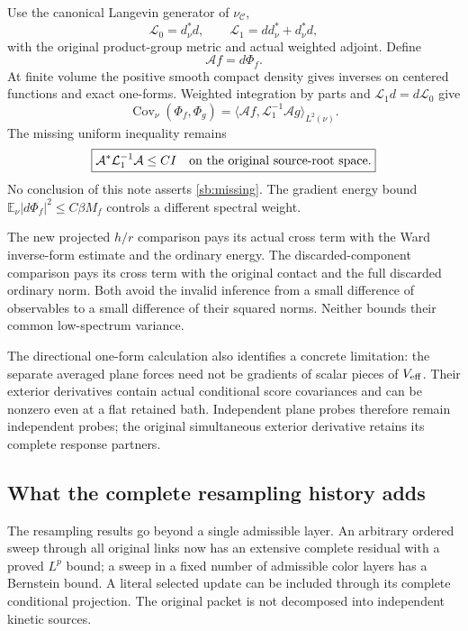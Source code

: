 \documentclass[11pt]{article}
\theoremstyle{definition}\newtheorem{definition}[theorem]{Definition}
\theoremstyle{remark}\newtheorem{remark}[theorem]{Remark}
\newcommand{\E}{\mathbb E}\newcommand{\Var}{\operatorname{Var}}
\newcommand{\Cov}{\operatorname{Cov}}\newcommand{\Tr}{\operatorname{Tr}}
\newcommand{\inner}[2]{\langle #1,#2\rangle}
\begin{document}
Use the canonical Langevin generator of \(\nu_{\mathcal C}\),
\[
 \mathcal L_0=d_\nu^*d,\qquad
 \mathcal L_1=dd_\nu^*+d_\nu^*d,
\]
with the original product-group metric and actual weighted adjoint. Define
\[
 \mathcal A f=d\Phi_f.
\]
At finite volume the positive smooth compact density gives inverses on centered functions and exact one-forms. Weighted integration by parts and
\(\mathcal L_1d=d\mathcal L_0\) give
\begin{equation}
 \Cov_\nu(\Phi_f,\Phi_g)
 =
 \inner{\mathcal Af}{\mathcal L_1^{-1}\mathcal Ag}_{L^2(\nu)}.
 \label{sb:actualresolvent}
\end{equation}
The missing uniform inequality remains
\begin{equation}
 \boxed{\mathcal A^*\mathcal L_1^{-1}\mathcal A\le CI
        \quad\hbox{on the original source-root space}.}
 \label{sb:missing}
\end{equation}
No conclusion of this note asserts \eqref{sb:missing}. The gradient energy bound
\(\E_\nu|d\Phi_f|^2\le C\beta M_f\) controls a different spectral weight.

The new projected \(h/r\) comparison pays its actual cross term with the Ward inverse-form estimate and the ordinary energy. The discarded-component comparison pays its cross term with the original contact and the full discarded ordinary norm. Both avoid the invalid inference from a small difference of observables to a small difference of their squared norms. Neither bounds their common low-spectrum variance.

The directional one-form calculation also identifies a concrete limitation: the separate averaged plane forces need not be gradients of scalar pieces of \(V_{\rm eff}\). Their exterior derivatives contain actual conditional score covariances and can be nonzero even at a flat retained bath. Independent plane probes therefore remain independent probes; the original simultaneous exterior derivative retains its complete response partners.

\subsection{What the complete resampling history adds}

The resampling results go beyond a single admissible layer. An arbitrary ordered sweep through all original links now has an extensive complete residual with a proved \(L^p\) bound; a sweep in a fixed number of admissible color layers has a Bernstein bound. A literal selected update can be included through its complete conditional projection. The original packet is not decomposed into independent kinetic sources.
\end{document}
